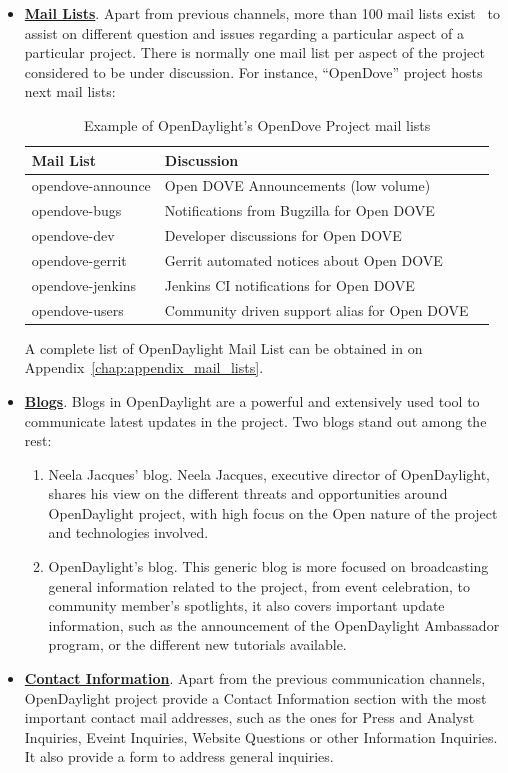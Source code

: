 \documentclass[a4paper, 12pt]{book}
\begin{document}
\begin{itemize}
\item{\textbf{\underline{Mail Lists}}}. Apart from previous channels, more than 100 mail lists exist~\cite{OpenDaylightMailLists} to assist on different question and issues regarding a particular aspect of a particular project. There is normally one mail list per aspect of the project considered to be under discussion. For instance, ``OpenDove'' project hosts next mail lists:
\begin{table}[H]
\footnotesize
\begin{center}
\begin{tabular}{|l|l|l|}
\hline
\textbf{Mail List} & \textbf{Discussion} \\ \hline
opendove-announce	& Open DOVE Announcements (low volume) \\ \hline
opendove-bugs	& Notifications from Bugzilla for Open DOVE \\ \hline
opendove-dev	& Developer discussions for Open DOVE \\ \hline
opendove-gerrit	& Gerrit automated notices about Open DOVE \\ \hline
opendove-jenkins	& Jenkins CI notifications for Open DOVE \\ \hline
opendove-users	& Community driven support alias for Open DOVE \\ \hline
\end{tabular}
\end{center}
\caption{Example of OpenDaylight's OpenDove Project mail lists}
\label{tab:projectmaillist}
\end{table}
A complete list of OpenDaylight Mail List can be obtained in on Appendix~\ref{chap:appendix_mail_lists}.
\item{\textbf{\underline{Blogs}}}. Blogs in OpenDaylight are a powerful and extensively used tool to communicate latest updates in the project. Two blogs stand out among the rest:
\begin{enumerate}
\item{Neela Jacques' blog}. Neela Jacques, executive director of OpenDaylight, shares his view on the different threats and opportunities around OpenDaylight project, with high focus on the Open nature of the project and technologies involved.
\item{OpenDaylight's blog}. This generic blog is more focused on broadcasting general information related to the project, from event celebration, to community member's spotlights, it also covers important update information, such as the announcement of the OpenDaylight Ambassador program, or the different new tutorials available.
\end{enumerate}
\item{\textbf{\underline{Contact Information}}}. Apart from the previous communication channels, OpenDaylight project provide a Contact Information section with the most important contact mail addresses, such as the ones for Press and Analyst Inquiries, Eveint Inquiries, Website Questions or other Information Inquiries. It also provide a form to address general inquiries.
\end{itemize}
\end{document}
